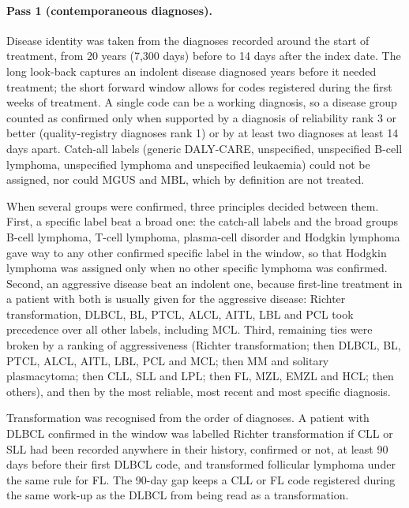 \documentclass[10pt]{article}
\begin{document}
\paragraph{Pass 1 (contemporaneous diagnoses).} Disease identity was taken
from the diagnoses recorded around the start of treatment, from 20 years (7,300
days) before to 14 days after the index date. The long look-back captures an
indolent disease diagnosed years before it needed treatment; the short forward
window allows for codes registered during the first weeks of treatment. A single
code can be a working diagnosis, so a disease group counted as confirmed only
when supported by a diagnosis of reliability rank 3 or better (quality-registry
diagnoses rank 1) or by at least two diagnoses at least 14 days apart. Catch-all
labels (generic DALY-CARE, unspecified, unspecified B-cell lymphoma, unspecified
lymphoma and unspecified leukaemia) could not be assigned, nor could MGUS and
MBL, which by definition are not treated.

When several groups were confirmed, three principles decided between them.
First, a specific label beat a broad one: the catch-all labels and the broad
groups B-cell lymphoma, T-cell lymphoma, plasma-cell disorder and Hodgkin
lymphoma gave way to any other confirmed specific label in the window, so that
Hodgkin lymphoma was assigned only when no other specific lymphoma was
confirmed. Second, an aggressive disease beat an indolent one, because
first-line treatment in a patient with both is usually given for the aggressive
disease: Richter transformation, DLBCL, BL, PTCL, ALCL, AITL, LBL and PCL took
precedence over all other labels, including MCL. Third, remaining ties were
broken by a ranking of aggressiveness (Richter transformation; then DLBCL, BL,
PTCL, ALCL, AITL, LBL, PCL and MCL; then MM and solitary plasmacytoma; then CLL,
SLL and LPL; then FL, MZL, EMZL and HCL; then others), and then by the most
reliable, most recent and most specific diagnosis.

Transformation was recognised from the order of diagnoses. A patient with DLBCL
confirmed in the window was labelled Richter transformation if CLL or SLL had
been recorded anywhere in their history, confirmed or not, at least 90 days
before their first DLBCL code, and transformed follicular lymphoma under the
same rule for FL. The 90-day gap keeps a CLL or FL code registered during the
same work-up as the DLBCL from being read as a transformation.
\end{document}
